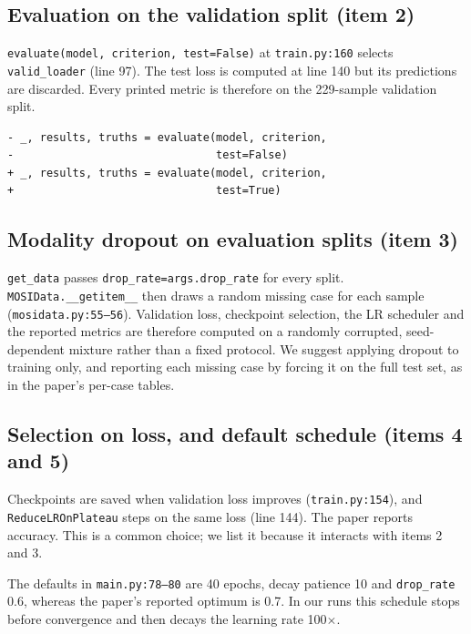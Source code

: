 \documentclass[lettersize,journal]{IEEEtran}
\begin{document}
\subsection{Evaluation on the validation split (item 2)}
\texttt{evaluate(model, criterion, test=False)} at \texttt{train.py:160} selects \texttt{valid\_loader} (line 97). The test loss is computed at line 140 but its predictions are discarded. Every printed metric is therefore on the 229-sample validation split.
\begin{Verbatim}
- _, results, truths = evaluate(model, criterion,
-                               test=False)
+ _, results, truths = evaluate(model, criterion,
+                               test=True)
\end{Verbatim}

\subsection{Modality dropout on evaluation splits (item 3)}
\texttt{get\_data} passes \texttt{drop\_rate=args.drop\_rate} for every split. \texttt{MOSIData.\_\_getitem\_\_} then draws a random missing case for each sample (\texttt{mosidata.py:55--56}). Validation loss, checkpoint selection, the LR scheduler and the reported metrics are therefore computed on a randomly corrupted, seed-dependent mixture rather than a fixed protocol. We suggest applying dropout to training only, and reporting each missing case by forcing it on the full test set, as in the paper's per-case tables.

\subsection{Selection on loss, and default schedule (items 4 and 5)}
Checkpoints are saved when validation loss improves (\texttt{train.py:154}), and \texttt{ReduceLROnPlateau} steps on the same loss (line 144). The paper reports accuracy. This is a common choice; we list it because it interacts with items 2 and 3.

The defaults in \texttt{main.py:78--80} are 40 epochs, decay patience 10 and \texttt{drop\_rate} 0.6, whereas the paper's reported optimum is 0.7. In our runs this schedule stops before convergence and then decays the learning rate 100$\times$.
\end{document}
